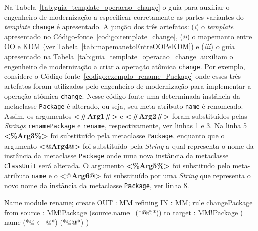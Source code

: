 Na Tabela~\ref{tab:guia_template_operacao_change} o guia para auxiliar o engenheiro de modernização a especificar corretamente as partes variantes do \textit{template} \texttt{change} é apresentado. A junção dos três artefatos: (\textit{i}) o \textit{template} apresentado no Código-fonte~\ref{codigo:template_change}, (\textit{ii}) o mapemanto entre OO e KDM (ver Tabela~\ref{tab:mapemanetoEntreOOPeKDM}) e (\textit{iii}) o guia apresentado na Tabela~\ref{tab:guia_template_operacao_change} auxiliam o engenheiro de modernização a criar a operação atômica \texttt{change}. Por exemplo, considere o Código-fonte~\ref{codigo:exemplo_rename_Package} onde esses três artefatos foram utilizados pelo engenheiro de modernização para implementar a operação atômica \texttt{change}. Nesse código-fonte uma determinada instância da metaclasse \texttt{Package} é alterado, ou seja, seu meta-atributo \texttt{name} é renomeado. Assim, os argumentos \textbf{<\#Arg1\#>} e \textbf{<\#Arg2\#>} foram substituídos pelas \textit{Strings} \texttt{renamePackage} e \texttt{rename}, respectivamente, ver linhas 1 e 3. Na linha 5 \textbf{<\%Arg3\%>} foi substituído pela metaclasse \texttt{Package}, enquanto que o argumento \textbf{<$@$Arg4$@$>} foi substituído pela \textit{String} \texttt{} a qual representa o nome da instância da metaclasse \texttt{Package} onde uma nova instância da metaclasse \texttt{ClassUnit} será alterada. O argumento \textbf{<\%Arg5\%>} foi substitudo pelo meta-atributo \texttt{name} e o \textbf{<$@$Arg6$@$>} foi substituído por uma \textit{String} que representa o novo nome da instância da metaclasse \texttt{Package}, ver linha 8.



\begin{codigo}[caption={[ATL para realizar a operação atômica \texttt{change} \texttt{ClassUnit}.] ATL para realizar a operação atômica \texttt{change} \texttt{ClassUnit}.},escapeinside={(*@}{@*)}, basicstyle=\footnotesize, label={codigo:exemplo_rename_Package}, language=ATL]{Name}
module rename;
create OUT : MM refining IN : MM;
rule changePackage {
	from
		source : MM!Package (source.name=(*@@*))
	to 
		target : MM!Package (
			name (*@$\leftarrow$@*) (*@@*)
		)
}
\end{codigo}


